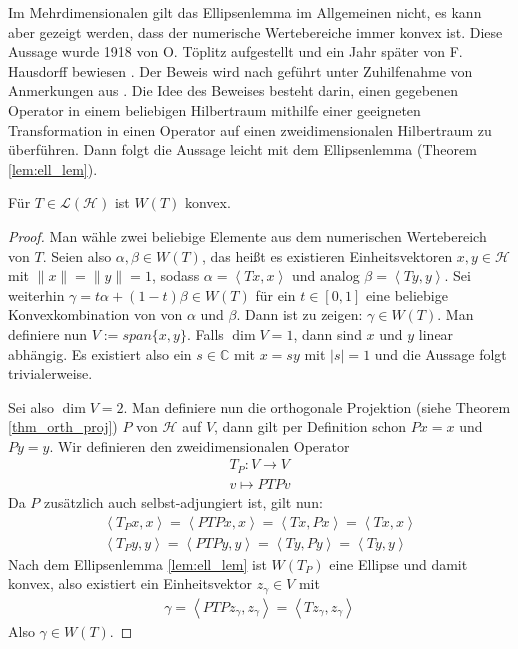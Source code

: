 Im Mehrdimensionalen gilt das Ellipsenlemma im Allgemeinen nicht, es kann aber gezeigt werden, dass der numerische Wertebereiche immer konvex ist. Diese Aussage wurde 1918 von O. Töplitz \parencite{Toeplitz1918} aufgestellt und ein Jahr später von F. Hausdorff bewiesen \parencite{Hausdorff1919}. Der Beweis wird nach \parencite[][S. 4]{gustafson1997numerical} geführt unter Zuhilfenahme von Anmerkungen aus \parencite[][Problem 210]{halmos2012hilbert}. Die Idee des Beweises besteht darin, einen gegebenen Operator in einem beliebigen Hilbertraum mithilfe einer geeigneten Transformation in einen Operator auf einen zweidimensionalen Hilbertraum zu überführen. Dann folgt die Aussage leicht mit dem Ellipsenlemma (Theorem \ref{lem:ell_lem}).

\begin{thm} \label{thm:toe_haus}
	Für $T \in \mathcal{L}(\mathcal{H})$ ist $W(T)$ konvex.
\end{thm} 
\begin{proof}
	Man wähle zwei beliebige Elemente aus dem numerischen Wertebereich von $T$. Seien also $\alpha, \beta \in W(T)$, das heißt es existieren Einheitsvektoren $x,y \in \mathcal{H}$ mit $\|x\|=\|y\|=1$, sodass $\alpha = \left< Tx,x \right>$ und analog $\beta = \left< Ty,y \right>$. Sei weiterhin $\gamma=t\alpha + (1-t)\beta \in W(T)$ für ein $t \in [0,1]$ eine beliebige Konvexkombination von von $\alpha$ und $\beta$. Dann ist zu zeigen: $\gamma \in W(T)$. Man definiere nun $V:=span \{x,y\}$. Falls $\dim V =1$, dann sind $x$ und $y$ linear abhängig. Es existiert also ein $s\in \mathbb{C}$ mit $x = sy$ mit $|s|=1$ und die Aussage folgt trivialerweise.

	Sei also $\dim V =2$. Man definiere nun die orthogonale Projektion (siehe Theorem \ref{thm_orth_proj}) $P$ von $\mathcal{H}$ auf $V$, dann gilt per Definition schon $Px=x$ und $Py=y$. Wir definieren den zweidimensionalen Operator 
	\begin{align*}
		T_P : V \longrightarrow V \\
		v \mapsto PTPv
	\end{align*}
	Da $P$ zusätzlich auch selbst-adjungiert ist, gilt nun:
	\begin{align}
		\left< T_Px,x \right> = \left< PTPx,x \right> = \left< Tx,Px \right> = \left< Tx,x \right> \\
		\left< T_Py,y \right> = \left< PTPy,y \right> = \left< Ty,Py \right> = \left< Ty,y \right>
	\end{align}
	Nach dem Ellipsenlemma \ref{lem:ell_lem} ist $W(T_P)$ eine Ellipse und damit konvex, also existiert ein Einheitsvektor $z_\gamma \in V$ mit 
	\begin{align}
		\gamma = \left< PTPz_\gamma, z_\gamma \right>= \left< Tz_\gamma, z_\gamma \right>
	\end{align}
	Also $\gamma \in W(T)$.
\end{proof}



